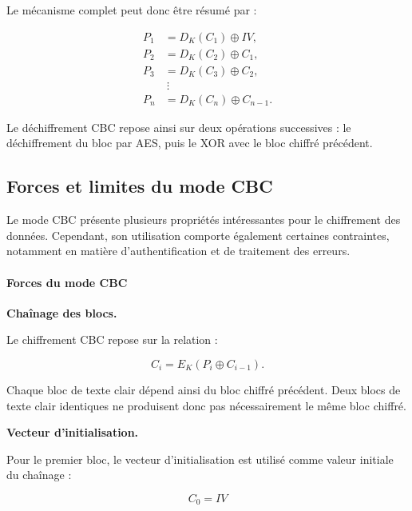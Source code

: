 \documentclass[12pt,a4paper]{article}
\begin{document}
Le mécanisme complet peut donc être résumé par :

\[
\boxed{
\begin{aligned}
P_1&=D_K(C_1)\oplus IV,\\
P_2&=D_K(C_2)\oplus C_1,\\
P_3&=D_K(C_3)\oplus C_2,\\
&\ \vdots\\
P_n&=D_K(C_n)\oplus C_{n-1}.
\end{aligned}
}
\]

Le déchiffrement CBC repose ainsi sur deux opérations
successives : le déchiffrement du bloc par AES, puis le XOR
avec le bloc chiffré précédent.




\subsection{Forces et limites du mode CBC}



Le mode CBC présente plusieurs propriétés intéressantes pour le
chiffrement des données. Cependant, son utilisation comporte également
certaines contraintes, notamment en matière d'authentification et de
traitement des erreurs.


\paragraph{Forces du mode CBC}

\textbf{Chaînage des blocs.}

Le chiffrement CBC repose sur la relation :

\[
C_i = E_K(P_i \oplus C_{i-1}).
\]

Chaque bloc de texte clair dépend ainsi du bloc chiffré précédent.
Deux blocs de texte clair identiques ne produisent donc pas
nécessairement le même bloc chiffré.

\textbf{Vecteur d'initialisation.}

Pour le premier bloc, le vecteur d'initialisation est utilisé comme
valeur initiale du chaînage :

\[
C_0 = IV
\]
\end{document}
